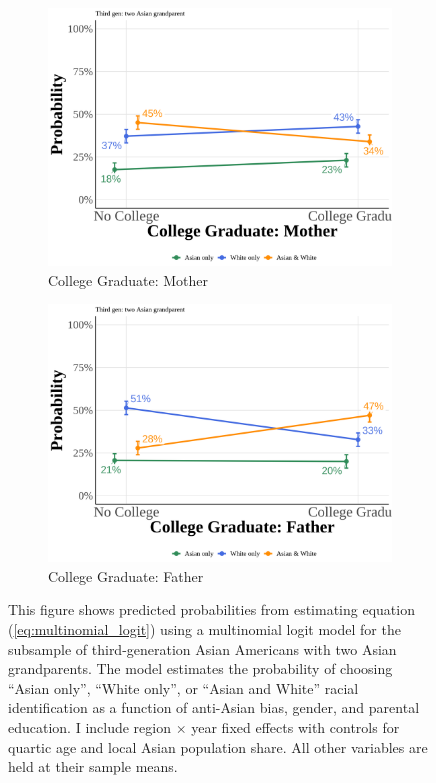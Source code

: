 \begin{center}
\begin{figure}[!htb]
\vspace{0.5cm}

\begin{subfigure}{.48\textwidth}
\caption{College Graduate: Mother}
\centering
\includegraphics[width=1\linewidth]{simple_pp_MomGradCollege_third_two.png}
\end{subfigure}
\hfill
\begin{subfigure}{.48\textwidth}
\caption{College Graduate: Father}
\centering
\includegraphics[width=1\linewidth]{simple_pp_DadGradCollege_third_two.png}
\end{subfigure}

\caption*{\footnotesize{This figure shows predicted probabilities from estimating equation (\ref{eq:multinomial_logit}) using a multinomial logit model for the subsample of third-generation Asian Americans with two Asian grandparents. The model estimates the probability of choosing ``Asian only'', ``White only'', or ``Asian and White'' racial identification as a function of anti-Asian bias, gender, and parental education. I include region $\times$ year fixed effects with controls for quartic age and local Asian population share. All other variables are held at their sample means.}}
\end{figure}
\end{center}

